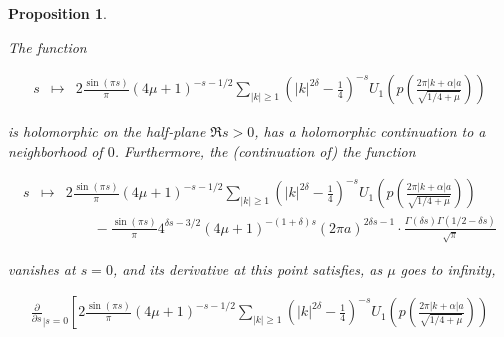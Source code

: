 \documentclass{jams-l}
\newtheorem{proposition}[theorem]{Proposition}
\theoremstyle{definition}
\theoremstyle{remark}
\numberwithin{equation}{section}
\begin{document}
            \begin{proposition}
            \label{PropA10}
            
                The function
                
                \[ \begin{array}{lll}
                        s & \longmapsto & 2 \frac{\sin \left(\pi s \right)}{\pi} \left( 4 \mu + 1 \right)^{-s-1/2} \sum\limits_{\left \vert k \right \vert \geqslant 1} \left( \left \vert k \right \vert^{2 \delta} - \frac{1}{4} \right)^{-s} U_1 \left( p \left( \frac{2 \pi \left \vert k + \alpha \right \vert a}{\sqrt{1/4 + \mu}} \right) \right)
                    \end{array} \]
                
                \noindent is holomorphic on the half-plane $\Re s > 0$, has a holomorphic continuation to a neighborhood of $0$. Furthermore, the (continuation of) the function 
                
                \[ \begin{array}{lll}
                        \scriptstyle s & \scriptstyle \longmapsto & \scriptstyle 2 \frac{\sin \left(\pi s \right)}{\pi} \left( 4 \mu + 1 \right)^{-s-1/2} \sum\limits_{\left \vert k \right \vert \geqslant 1} \left( \left \vert k \right \vert^{2 \delta} - \frac{1}{4} \right)^{-s} U_1 \left( p \left( \frac{2 \pi \left \vert k + \alpha \right \vert a}{\sqrt{1/4 + \mu}} \right) \right) \\[1em]
                        
                        && \qquad \scriptstyle - \frac{\sin \left( \pi s \right)}{\pi} 4^{\delta s - 3/2} \left( 4 \mu + 1 \right)^{- \left( 1 + \delta \right) s} \left( 2 \pi a \right)^{2 \delta s - 1} \cdot \frac{\Gamma \left( \delta s \right) \Gamma \left( 1/2 - \delta s \right)}{\sqrt{\pi}}
                    \end{array} \]
                
                \noindent vanishes at $s=0$, and its derivative at this point satisfies, as $\mu$ goes to infinity,
                
                \[ \begin{array}{lll}
                        \scriptstyle \frac{\partial}{\partial s}_{\left \vert s = 0 \right.} \left[ 2 \frac{\sin \left(\pi s \right)}{\pi} \left( 4 \mu + 1 \right)^{-s-1/2} \sum\limits_{\left \vert k \right \vert \geqslant 1} \left( \left \vert k \right \vert^{2 \delta} - \frac{1}{4} \right)^{-s} U_1 \left( p \left( \frac{2 \pi \left \vert k + \alpha \right \vert a}{\sqrt{1/4 + \mu}} \right) \right) \right. \\[1em]
                        

\end{array}\]
\end{proposition}
\end{document}
